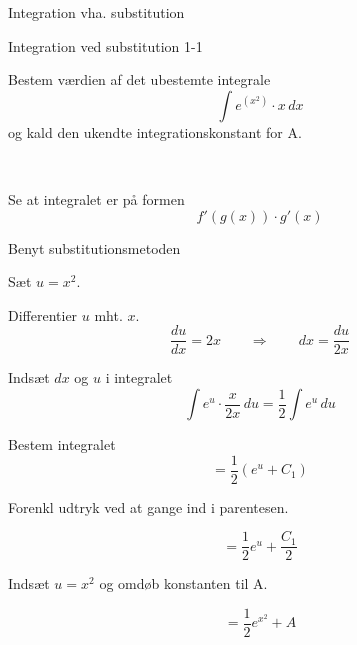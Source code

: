 \documentclass{article}
\begin{document}
Integration vha. substitution
\tableofcontents


\begin{exercise}{Integration ved substitution 1-1}
	
	
	Bestem værdien af det ubestemte integrale
	\[
	\int e^{(x^2)} \cdot x \, dx
	\]
	og kald den ukendte integrationskonstant for A.
	
	 \\
	
	
	
	\hint
	
	Se at integralet er på formen
	\[
	f'(g(x)) \cdot g'(x)
	\]
	
	\hint
	
	Benyt substitutionsmetoden
	
	\hint
	
	Sæt $u=x^2$.
	
	
	\hint
	
	Differentier $u$ mht. $x$.
	\[
	\frac{du}{dx} = 2x \qquad	\Rightarrow \qquad dx = \frac{du}{2x}
	\]
	
	\hint
	
	Indsæt $dx$ og $u$ i integralet
	\[
	\int e^{u} \cdot \frac{x}{2x} \, du = \frac{1}{2} \int e^u \, du
	\]
	
	\hint
	
	Bestem integralet
	\[
	= \frac{1}{2} \left( e^u + C_1 \right)
	\]
	
	\hint
	Forenkl udtryk ved at gange ind i parentesen.
	
	\hint
	
	\[
	= \frac{1}{2} e^u + \frac{C_1}{2}
	\]
	
	\hint
	
	Indsæt $u = x^2$ og omdøb konstanten  til A.
	
	\hint
	
	\[
	= \frac{1}{2} e^{x^2} + A
	\]
	
	
\end{exercise}

\newpage
\end{document}

